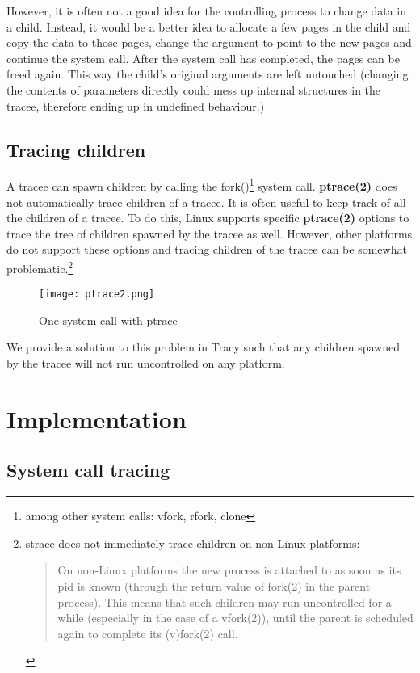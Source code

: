 \documentclass[a4paper, twoside, 10pt, twocolumn]{report}
\begin{document}
However, it is often not a good idea for the controlling process to change data
in a child. Instead, it would be a better idea to allocate a few pages in the
child and copy the data to those pages, change the argument to point to the new
pages and continue the system call. After the system call has completed, the
pages can be freed again. This way the child's original arguments are left
untouched (changing the contents of parameters directly could mess up internal
structures in the tracee, therefore ending up in undefined behaviour.)

\section{Tracing children}

A tracee can spawn children by calling the fork()\footnote{among other system
calls: vfork, rfork, clone} system call. \textbf{ptrace(2)} does not
automatically trace children of a tracee. It is often useful to keep track of
all the children of a tracee. To do this, Linux supports specific
\textbf{ptrace(2)} options to trace the tree of children spawned by the tracee
as well. However, other platforms do not support these options and tracing
children of the tracee can be somewhat problematic.\footnote{strace does not
immediately trace children on non-Linux platforms:
\begin{quote}
    On non-Linux platforms the new process is attached to as soon as its pid is
    known (through the return value of fork(2) in the parent process).
    This means that such children may run uncontrolled for a while
    (especially in the case of a vfork(2)), until the parent is scheduled
    again to complete its (v)fork(2)  call.
\end{quote}
}

\begin{figure}
\label{fig2}
\texttt{[image: ptrace2.png]}
\caption{One system call with ptrace}
\end{figure}

We provide a solution to this problem in Tracy such that any children spawned
by the tracee will not run uncontrolled on any platform.

\chapter{Implementation}

\section{System call tracing}
\end{document}

